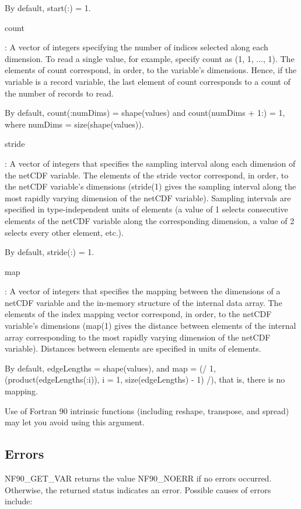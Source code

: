 By default, start(\+:) = 1.

{\ttfamily count}

\+: A vector of integers specifying the number of indices selected along each dimension. To read a single value, for example, specify count as (1, 1, ..., 1). The elements of count correspond, in order, to the variable’s dimensions. Hence, if the variable is a record variable, the last element of count corresponds to a count of the number of records to read.

By default, count(\+:num\+Dims) = shape(values) and count(num\+Dims + 1\+:) = 1, where num\+Dims = size(shape(values)).

{\ttfamily stride}

\+: A vector of integers that specifies the sampling interval along each dimension of the net\+C\+DF variable. The elements of the stride vector correspond, in order, to the net\+C\+DF variable’s dimensions (stride(1) gives the sampling interval along the most rapidly varying dimension of the net\+C\+DF variable). Sampling intervals are specified in type-\/independent units of elements (a value of 1 selects consecutive elements of the net\+C\+DF variable along the corresponding dimension, a value of 2 selects every other element, etc.).

By default, stride(\+:) = 1.

{\ttfamily map}

\+: A vector of integers that specifies the mapping between the dimensions of a net\+C\+DF variable and the in-\/memory structure of the internal data array. The elements of the index mapping vector correspond, in order, to the net\+C\+DF variable’s dimensions (map(1) gives the distance between elements of the internal array corresponding to the most rapidly varying dimension of the net\+C\+DF variable). Distances between elements are specified in units of elements.

By default, edge\+Lengths = shape(values), and map = (/ 1, (product(edge\+Lengths(\+:i)), i = 1, size(edge\+Lengths) -\/ 1) /), that is, there is no mapping.

Use of Fortran 90 intrinsic functions (including reshape, transpose, and spread) may let you avoid using this argument.

\subsection*{Errors}

N\+F90\+\_\+\+G\+E\+T\+\_\+\+V\+AR returns the value N\+F90\+\_\+\+N\+O\+E\+RR if no errors occurred. Otherwise, the returned status indicates an error. Possible causes of errors include\+:


